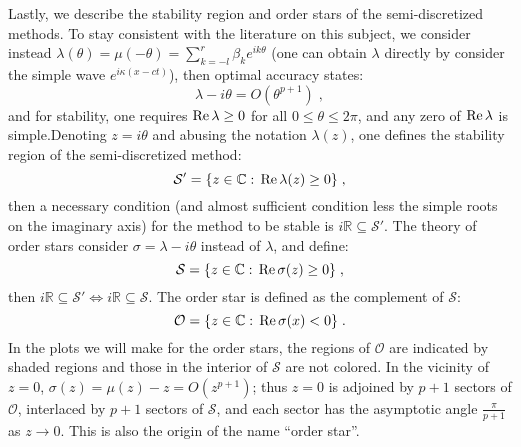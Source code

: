Lastly, we describe the stability region and order stars of the semi-discretized methods.
To stay consistent with the literature on this subject, we consider instead $\lambda(\theta)=\mu(-\theta)=\sum_{k=-l}^r\beta_ke^{ik\theta}$ (one can obtain $\lambda$ directly by consider the simple wave $e^{i\kappa(x-ct)}$), then optimal accuracy states:
\begin{equation}\label{eq:bg_fd_dx_lambda_order}
  \lambda - i\theta = O(\theta^{p+1})\;,
\end{equation}
and for stability, one requires $\operatorname{Re}\lambda\ge0$ for all $0\le\theta\le2\pi$, and any zero of $\operatorname{Re}\lambda$ is simple.Denoting $z=i\theta$ and abusing the notation $\lambda(z)$, one defines the stability region of the semi-discretized method:
\begin{displaymath}
  \mathcal{S}' = \{z\in\mathbb{C}:\,\operatorname{Re}\lambda(z)\ge0\}\;,
\end{displaymath}
then a necessary condition (and almost sufficient condition less the simple roots on the imaginary axis) for the method to be stable is $i\mathbb{R}\subseteq\mathcal{S}'$.
The theory of order stars consider $\sigma=\lambda-i\theta$ instead of $\lambda$, and define:
\begin{equation}\label{eq:bg_fd_dx_lambda_stab}
  \mathcal{S} = \{z\in\mathbb{C}:\,\operatorname{Re}\sigma(z)\ge0\}\;,
\end{equation}
then $i\mathbb{R}\subseteq\mathcal{S}'\Leftrightarrow i\mathbb{R}\subseteq\mathcal{S}$.
The order star is defined as the complement of $\mathcal{S}$:
\begin{equation}\label{eq:bg_fd_dx_lambda_os}
  \mathcal{O} = \{z\in\mathbb{C}:\,\operatorname{Re}\sigma(x)<0\}\;.
\end{equation}
In the plots we will make for the order stars, the regions of $\mathcal{O}$ are indicated by shaded regions and those in the interior of $\mathcal{S}$ are not colored.
In the vicinity of $z=0$, $\sigma(z)=\mu(z)-z=O(z^{p+1})$; thus $z=0$ is adjoined by $p+1$ sectors of $\mathcal{O}$, interlaced by $p+1$ sectors of $\mathcal{S}$, and each sector has the asymptotic angle $\frac{\pi}{p+1}$ as $z\to0$.
This is also the origin of the name ``order star''.
